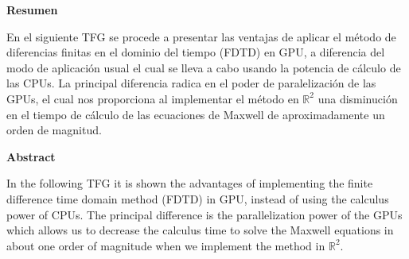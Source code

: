 \documentclass[11pt,a4paper,twoside,pdf]{article}
\numberwithin{equation}{section}
\begin{document}
\begin{center}

{\bf Resumen}
\bigskip

\begin{minipage}{0.8\linewidth}
En el siguiente TFG se procede a presentar las ventajas de aplicar el método de diferencias finitas en el dominio del tiempo (FDTD) en GPU, a diferencia del modo de aplicación usual el cual se lleva a cabo usando la potencia de cálculo de las CPUs. La principal diferencia radica en el poder de paralelización de las GPUs, el cual nos proporciona al implementar el método en $\mathbb R^{2}$ una disminución en el tiempo de cálculo de las ecuaciones de Maxwell de aproximadamente un orden de magnitud.

\end{minipage}

\vfill

{\bf Abstract} 
\bigskip

\begin{minipage}{0.8\linewidth}
In the following TFG it is shown the advantages of implementing the finite difference time domain method (FDTD) in GPU, instead of using the calculus power of CPUs. The principal difference is the parallelization power of the GPUs which allows us to decrease the calculus time to solve the Maxwell equations in about one order of magnitude when we implement the method in $\mathbb R^{2}$.
\end{minipage}

\vfill

\end{center}

\newpage
\end{document}
